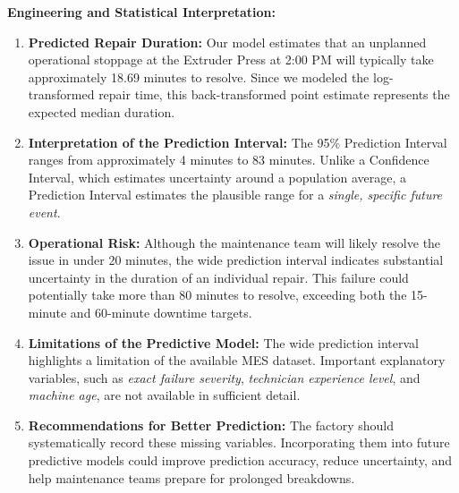 \textbf{Engineering and Statistical Interpretation:}
\begin{enumerate}
    \item \textbf{Predicted Repair Duration:}
    Our model estimates that an unplanned operational stoppage at the Extruder Press at 2:00 PM will typically take approximately 18.69 minutes to resolve. Since we modeled the log-transformed repair time, this back-transformed point estimate represents the expected median duration.

    \item \textbf{Interpretation of the Prediction Interval:}
    The 95\% Prediction Interval ranges from approximately 4 minutes to 83 minutes. Unlike a Confidence Interval, which estimates uncertainty around a population average, a Prediction Interval estimates the plausible range for a \textit{single, specific future event}.

    \item \textbf{Operational Risk:}
    Although the maintenance team will likely resolve the issue in under 20 minutes, the wide prediction interval indicates substantial uncertainty in the duration of an individual repair. This failure could potentially take more than 80 minutes to resolve, exceeding both the 15-minute and 60-minute downtime targets.

    \item \textbf{Limitations of the Predictive Model:}
    The wide prediction interval highlights a limitation of the available MES dataset. Important explanatory variables, such as \textit{exact failure severity}, \textit{technician experience level}, and \textit{machine age}, are not available in sufficient detail.

    \item \textbf{Recommendations for Better Prediction:}
    The factory should systematically record these missing variables. Incorporating them into future predictive models could improve prediction accuracy, reduce uncertainty, and help maintenance teams prepare for prolonged breakdowns.
\end{enumerate}
